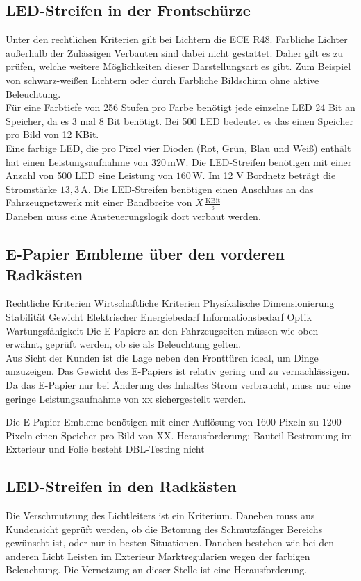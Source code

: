 \subsection{LED-Streifen in der Frontschürze}
Unter den rechtlichen Kriterien gilt bei Lichtern die ECE R48. Farbliche Lichter außerhalb der Zulässigen Verbauten sind dabei nicht gestattet. Daher gilt es zu prüfen, welche weitere Möglichkeiten dieser Darstellungsart es gibt. Zum Beispiel von schwarz-weißen Lichtern oder durch Farbliche Bildschirm ohne aktive Beleuchtung. \\
Für eine Farbtiefe von 256 Stufen pro Farbe benötigt jede einzelne LED 24 Bit an Speicher, da es 3 mal 8 Bit benötigt. Bei 500 LED bedeutet es das einen Speicher pro Bild von 12 KBit. \\
Eine farbige LED, die pro Pixel vier Dioden (Rot, Grün, Blau und Weiß) enthält hat einen Leistungsaufnahme von $ 320\,\mathrm{mW} $.  
Die LED-Streifen benötigen mit einer Anzahl von 500 LED eine Leistung von $ 160\,\mathrm{W} $. Im 12 V Bordnetz beträgt die Stromstärke $ 13,3\,\mathrm{A} $. Die LED-Streifen benötigen einen Anschluss an das Fahrzeugnetzwerk mit einer Bandbreite von $ X\,\frac{\mathrm{ KBit}}{\mathrm{s}} $ \\
Daneben muss eine Ansteuerungslogik dort verbaut werden.
\subsection{E-Papier Embleme über den vorderen Radkästen}
Rechtliche Kriterien
Wirtschaftliche Kriterien
Physikalische Dimensionierung
Stabilität
Gewicht
Elektrischer Energiebedarf
Informationsbedarf
Optik
Wartungsfähigkeit
Die E-Papiere an den Fahrzeugseiten müssen wie oben erwähnt, geprüft werden, ob sie als Beleuchtung gelten.\\
Aus Sicht der Kunden ist die Lage neben den Fronttüren ideal, um Dinge anzuzeigen.
Das Gewicht des E-Papiers ist relativ gering und zu vernachlässigen.
Da das E-Papier nur bei Änderung des Inhaltes Strom verbraucht, muss nur eine geringe Leistungsaufnahme von xx sichergestellt werden.

Die E-Papier Embleme benötigen mit einer Auflösung von 1600 Pixeln zu 1200 Pixeln einen Speicher pro Bild von XX.
Herausforderung: Bauteil Bestromung im Exterieur und
Folie besteht DBL-Testing nicht 
\subsection{LED-Streifen in den Radkästen}
Die Verschmutzung des Lichtleiters ist ein Kriterium.
Daneben muss aus Kundensicht geprüft werden, ob die Betonung des Schmutzfänger Bereichs gewünscht ist, oder nur in besten Situationen.
Daneben bestehen wie bei den anderen Licht Leisten im Exterieur Marktregularien wegen der farbigen Beleuchtung. Die Vernetzung an dieser Stelle ist eine Herausforderung.
